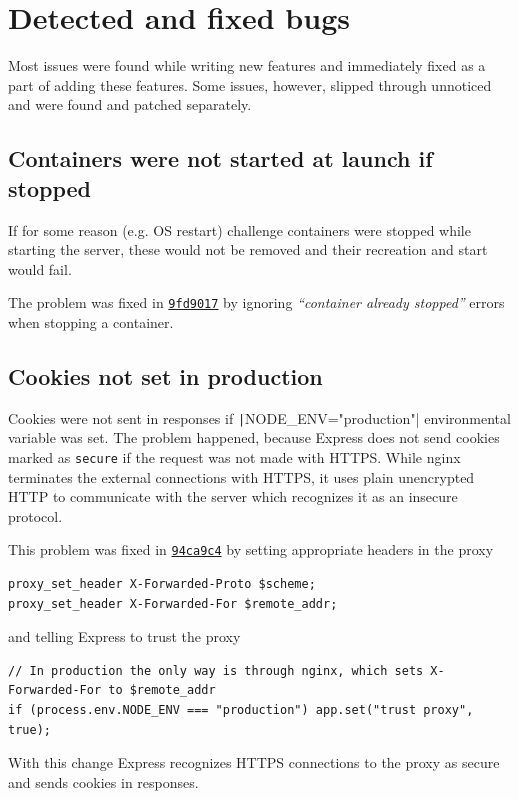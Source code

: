 \section{Detected and fixed bugs}

Most issues were found while writing new features and immediately fixed as a part of adding these features. Some issues, however, slipped through unnoticed and were found and patched separately.

\subsection{Containers were not started at launch if stopped}

If for some reason (e.g. OS restart) challenge containers were stopped while starting the server, these would not be removed and their recreation and start would fail.

The problem was fixed in \href{https://github.com/krzysdz/inz/commit/9fd9017ce994f577233ce0544bbd0cf1df3e0e55}{\texttt{9fd9017}} by ignoring \textit{\enquote{container already stopped}} errors when stopping a container.

\subsection{Cookies not set in production}

Cookies were not sent in responses if \texttt|NODE_ENV="production"| environmental variable was set. The problem happened, because Express does not send cookies marked as \texttt{secure} if the request was not made with HTTPS. While nginx terminates the external connections with HTTPS, it uses plain unencrypted HTTP to communicate with the server which recognizes it as an insecure protocol.

This problem was fixed in \href{https://github.com/krzysdz/inz/commit/94ca9c4124954c94c9fe8e27dc59305aa59b31ad}{\texttt{94ca9c4}} by setting appropriate headers in the proxy
\begin{verbatim}
proxy_set_header X-Forwarded-Proto $scheme;
proxy_set_header X-Forwarded-For $remote_addr;
\end{verbatim}
and telling Express to trust the proxy
\begin{verbatim}
// In production the only way is through nginx, which sets X-Forwarded-For to $remote_addr
if (process.env.NODE_ENV === "production") app.set("trust proxy", true);
\end{verbatim}
With this change Express recognizes HTTPS connections to the proxy as secure and sends cookies in responses.

